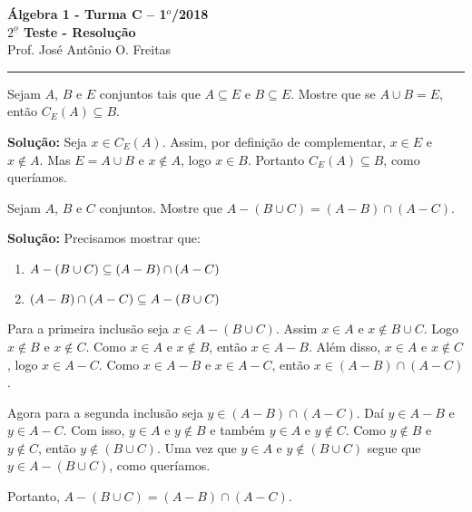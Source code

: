 \documentclass[12pt]{article}
\begin{document}


\begin{center}
{\Large\bf {\'A}lgebra 1 - Turma C -- 1$^{o}$/2018} \\ \vspace{9pt} {\large\bf
  $2^{\underline{o}}$ Teste - Resolu\c{c}\~ao}\\
\vspace{9pt} Prof. Jos{\'e} Ant{\^o}nio O. Freitas
\end{center}
\hrule

\vspace{.6cm}

\questao Sejam $A$, $B$ e $E$ conjuntos tais que $A \subseteq E$ e $B \subseteq E$. Mostre que se $A \cup B = E$, então $C_E(A) \subseteq B$.

\noindent\textbf{Solu\c{c}\~ao:} Seja $x \in C_E(A)$. Assim, por definição de complementar, $x \in E$ e $x \notin A$. Mas $E = A \cup B$ e $x \notin A$, logo $x \in B$. Portanto $C_E(A) \subseteq B$, como queríamos.

\vspace{.5cm}

\questao Sejam $A$, $B$ e $C$ conjuntos. Mostre que $A - (B \cup C) = (A - B) \cap (A - C)$.

\noindent\textbf{Solu\c{c}\~ao:} Precisamos mostrar que:
\begin{enumerate}[label={\roman*})]
	\item $A - (B \cup C) \subseteq (A - B) \cap (A - C)$
	\item $(A - B) \cap (A - C) \subseteq A - (B \cup C)$
\end{enumerate}

Para a primeira inclusão seja $x \in A - (B \cup C)$. Assim $x \in A$ e $x \notin B \cup C$. Logo $x \notin B$ e $x \notin C$. Como $x \in A$ e $x \notin B$, então $x \in A - B$. Além disso, $x \in A$ e $x \notin C$, logo $x \in A - C$. Como $x \in A - B$ e $x \in A - C$, então $x \in (A - B) \cap (A - C)$.

Agora para a segunda inclusão seja $y \in (A - B) \cap (A - C)$. Daí $y \in A - B$ e $y \in A - C$. Com isso, $y \in A$ e $y \notin B$ e também $y \in A$ e $y \notin C$. Como $y \notin B$ e $y \notin C$, então $y \notin (B \cup C)$. Uma vez que $y \in A$ e $y \notin (B \cup C)$ segue que $y \in A - (B \cup C)$, como queríamos.

Portanto, $A - (B \cup C) = (A - B) \cap (A - C)$.
\end{document}
